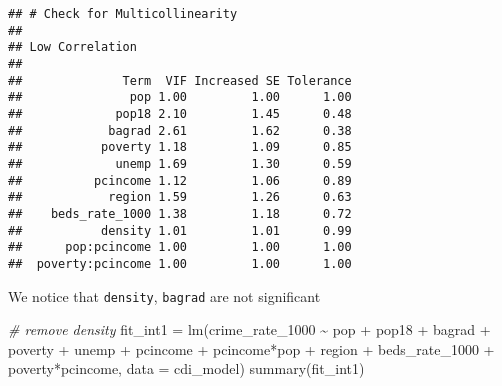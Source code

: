 \documentclass[
  11pt,
]{article}
\newenvironment{Shaded}{\begin{snugshade}}{\end{snugshade}}
\newcommand{\AttributeTok}[1]{\textcolor[rgb]{0.77,0.63,0.00}{#1}}
\newcommand{\CommentTok}[1]{\textcolor[rgb]{0.56,0.35,0.01}{\textit{#1}}}
\newcommand{\FunctionTok}[1]{\textcolor[rgb]{0.00,0.00,0.00}{#1}}
\newcommand{\NormalTok}[1]{#1}
\newcommand{\OtherTok}[1]{\textcolor[rgb]{0.56,0.35,0.01}{#1}}
\newcommand{\SpecialCharTok}[1]{\textcolor[rgb]{0.00,0.00,0.00}{#1}}
\begin{document}
\begin{verbatim}
## # Check for Multicollinearity
## 
## Low Correlation
## 
##              Term  VIF Increased SE Tolerance
##               pop 1.00         1.00      1.00
##             pop18 2.10         1.45      0.48
##            bagrad 2.61         1.62      0.38
##           poverty 1.18         1.09      0.85
##             unemp 1.69         1.30      0.59
##          pcincome 1.12         1.06      0.89
##            region 1.59         1.26      0.63
##    beds_rate_1000 1.38         1.18      0.72
##           density 1.01         1.01      0.99
##      pop:pcincome 1.00         1.00      1.00
##  poverty:pcincome 1.00         1.00      1.00
\end{verbatim}

We notice that \texttt{density}, \texttt{bagrad} are not significant

\begin{Shaded}
\begin{Highlighting}[]
\CommentTok{\# remove density}
\NormalTok{fit\_int1 }\OtherTok{=} \FunctionTok{lm}\NormalTok{(crime\_rate\_1000 }\SpecialCharTok{\textasciitilde{}}  
\NormalTok{                   pop }\SpecialCharTok{+}\NormalTok{ pop18 }\SpecialCharTok{+}\NormalTok{ bagrad }\SpecialCharTok{+}
\NormalTok{                  poverty }\SpecialCharTok{+}\NormalTok{ unemp }\SpecialCharTok{+}\NormalTok{ pcincome }\SpecialCharTok{+}\NormalTok{ pcincome}\SpecialCharTok{*}\NormalTok{pop }\SpecialCharTok{+}\NormalTok{ region }\SpecialCharTok{+}
\NormalTok{                  beds\_rate\_1000  }\SpecialCharTok{+}
\NormalTok{                  poverty}\SpecialCharTok{*}\NormalTok{pcincome, }\AttributeTok{data =}\NormalTok{ cdi\_model)}
\FunctionTok{summary}\NormalTok{(fit\_int1)}
\end{Highlighting}
\end{Shaded}
\end{document}
